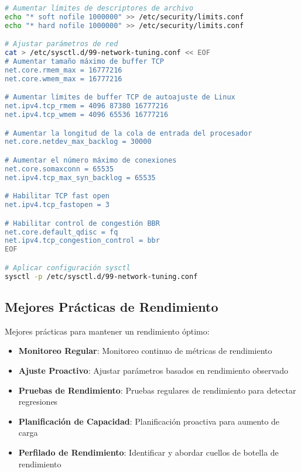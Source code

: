 \begin{lstlisting}[language=bash, caption=Ejemplo de Ajuste del Sistema]
# Aumentar límites de descriptores de archivo
echo "* soft nofile 1000000" >> /etc/security/limits.conf
echo "* hard nofile 1000000" >> /etc/security/limits.conf

# Ajustar parámetros de red
cat > /etc/sysctl.d/99-network-tuning.conf << EOF
# Aumentar tamaño máximo de buffer TCP
net.core.rmem_max = 16777216
net.core.wmem_max = 16777216

# Aumentar límites de buffer TCP de autoajuste de Linux
net.ipv4.tcp_rmem = 4096 87380 16777216
net.ipv4.tcp_wmem = 4096 65536 16777216

# Aumentar la longitud de la cola de entrada del procesador
net.core.netdev_max_backlog = 30000

# Aumentar el número máximo de conexiones
net.core.somaxconn = 65535
net.ipv4.tcp_max_syn_backlog = 65535

# Habilitar TCP fast open
net.ipv4.tcp_fastopen = 3

# Habilitar control de congestión BBR
net.core.default_qdisc = fq
net.ipv4.tcp_congestion_control = bbr
EOF

# Aplicar configuración sysctl
sysctl -p /etc/sysctl.d/99-network-tuning.conf
\end{lstlisting}

\subsection{Mejores Prácticas de Rendimiento}
Mejores prácticas para mantener un rendimiento óptimo:

\begin{itemize}
    \item \textbf{Monitoreo Regular}: Monitoreo continuo de métricas de rendimiento
    \item \textbf{Ajuste Proactivo}: Ajustar parámetros basados en rendimiento observado
    \item \textbf{Pruebas de Rendimiento}: Pruebas regulares de rendimiento para detectar regresiones
    \item \textbf{Planificación de Capacidad}: Planificación proactiva para aumento de carga
    \item \textbf{Perfilado de Rendimiento}: Identificar y abordar cuellos de botella de rendimiento
\end{itemize}